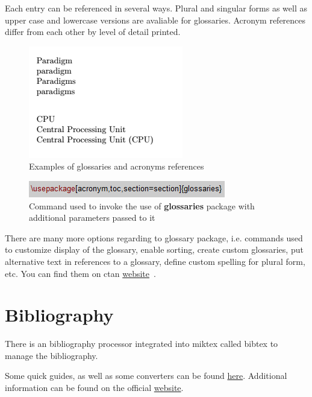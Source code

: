 Each entry can be referenced in several ways. Plural and singular forms as well as upper case and lowercase versions are avaliable for glossaries. Acronym references differ from each other by level of detail printed.

\begin{figure}[H]
\centering
\includegraphics[scale=1.0]{content/LaTeX/figures/glossary_calls.png}
\caption{Examples of glossaries and acronyms references}
\end{figure}

\begin{figure}[H]
\centering
\includegraphics[scale=1.0]{content/LaTeX/figures/usepackage_glossaries.png}
\caption{Command used to invoke the use of \textbf{glossaries} package with additional parameters passed to it}
\label{fig:usepackage_glossaries}
\end{figure}

There are many more options regarding to glossary package, i.e. commands used to customize display of the \gls{glossary}, enable sorting, create custom glossaries, put alternative text in references to a glossary, define custom spelling for plural form, etc. You can find them on \acrshort{ctan} \href{https://www.ctan.org/pkg/glossaries}{website}~\cite{ctan_glossaries}.

\section{Bibliography}

There is an bibliography processor integrated into \Gls{miktex} called \Gls{bibtex} to manage the bibliography.

\fbox{\textcolor{red}{Add content here - four photos from desktop}}

Some quick guides, as well as some converters can be found \href{https://www.bibtex.com/g/bibtex-format/}{here}. Additional information can be found on the official \href{https://tug.org/bibtex/}{website}.\\

